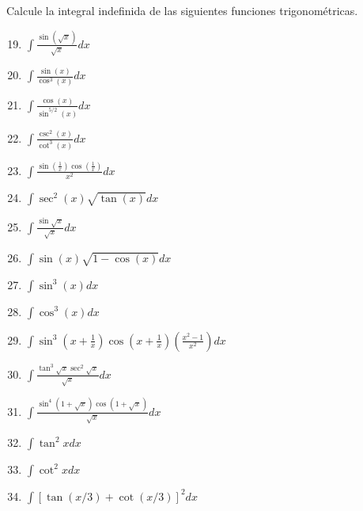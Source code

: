 {Calcule la integral indefinida de las siguientes funciones trigonom\'etricas.
\begin{multicols}{2}
\begin{enumerate}
\setcounter{enumi}{18}
\item $\displaystyle\int \frac{\sin (\sqrt{x})} {\sqrt{x}} dx $
\item $\displaystyle\int \frac{\sin (x)} {\cos^3 (x)  } dx $
\item $\displaystyle\int \frac{\cos (x)} {\sin^{5/2} (x)  } dx $
\item $\displaystyle\int \frac{\csc^2 (x)} {\cot^3 (x)  } dx $
\item $\displaystyle\int \frac{\sin (\frac{1}{x}) \cos (\frac{1}{x}) }{x^2} dx $
\item $\displaystyle\int \sec ^2 (x)\sqrt{\tan (x)} dx $
\item  $\displaystyle\int \frac{\sin\sqrt{x}}{\sqrt{x}} dx $
\item $\displaystyle\int \sin (x)\sqrt{1-\cos (x)} dx $
\item $\displaystyle\int \sin^3 (x)   dx $
\item $\displaystyle\int \cos^3 (x)   dx $
\item  $\displaystyle\int \sin^3(x+\frac{1}{x})\cos(x+\frac{1}{x})(\frac{x^2-1}{x^2}) dx $
\item  $\displaystyle\int \frac{\tan^3\sqrt{x}\sec^2 \sqrt{x}}{\sqrt{x}} dx $
\item  $\displaystyle\int \frac{\sin^4(1+\sqrt{x})\cos (1+\sqrt{x})}{\sqrt{x}} dx $
\item  $\displaystyle\int \tan ^2 xdx $
\item  $\displaystyle\int \cot ^2 xdx $
\item  $\displaystyle\int [\tan (x/3)+ \cot (x/3)]^2  dx $
\end{enumerate}
\end{multicols} 

}
